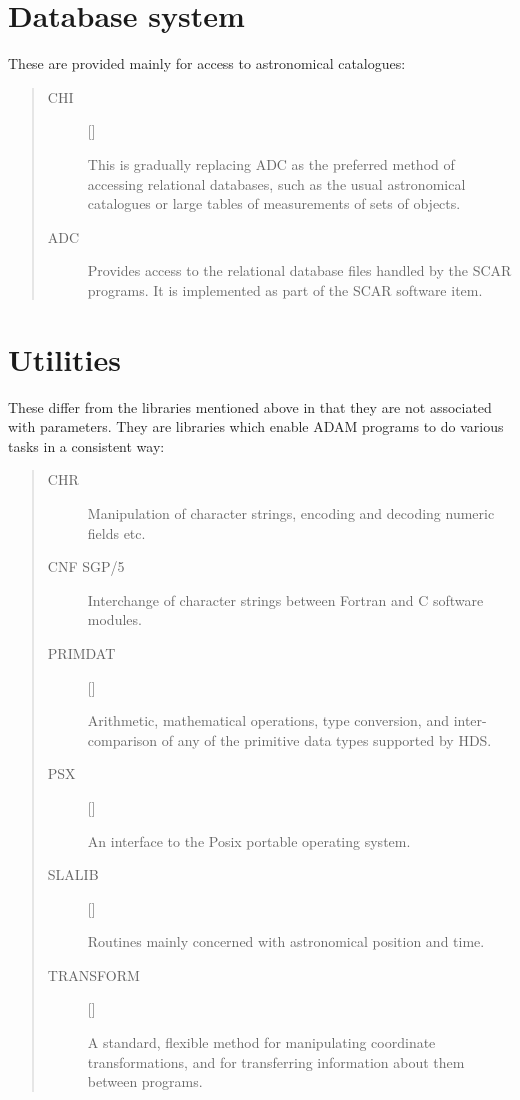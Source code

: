 \section{Database system}

These are provided mainly for access to astronomical catalogues:
\begin{quote}
\begin{description}

\item [CHI] \hfill []

 This is gradually replacing ADC as the preferred method of accessing
 relational databases, such as the usual astronomical catalogues or large
 tables of measurements of sets of objects.

\item [ADC] \hfill

 Provides access to the relational database files handled by the SCAR programs.
 It is implemented as part of the SCAR software item.

\end{description}
\end{quote}

\section{Utilities}

These differ from the libraries mentioned above in that they are not associated
with parameters.
They are libraries which enable ADAM programs to do various tasks in a
consistent way:
\begin{quote}
\begin{description}
\item [CHR \hfill {}]

 Manipulation of character strings, encoding and decoding numeric fields etc.

\item [CNF \hfill SGP/5]

 Interchange of character strings between Fortran and C software modules.

\item [PRIMDAT] \hfill []

 Arithmetic, mathematical operations, type conversion, and inter-comparison of
 any of the  primitive data types supported by HDS.

\item [PSX] \hfill []

  An interface to the Posix portable operating system.

\item [SLALIB] \hfill []

 Routines mainly concerned with astronomical position and time.

\item [TRANSFORM] \hfill []

 A standard, flexible method for manipulating coordinate transformations,
 and for transferring information about them between programs.

\end{description}
\end{quote}

